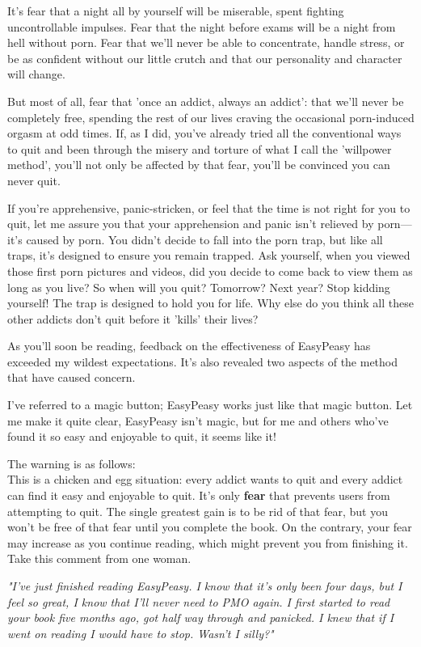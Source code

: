 \documentclass[easypeasy.tex]{subfiles}
\begin{document}
It's fear that a night all by yourself will be miserable, spent fighting uncontrollable impulses. Fear that the night before exams will be a night from hell without porn. Fear that we'll never be able to concentrate, handle stress, or be as confident without our little crutch and that our personality and character will change.

But most of all, fear that 'once an addict, always an addict': that we'll never be completely free, spending the rest of our lives craving the occasional porn-induced orgasm at odd times. If, as I did, you've already tried all the conventional ways to quit and been through the misery and torture of what I call the 'willpower method', you'll not only be affected by that fear, you'll be convinced you can never quit.

If you're apprehensive, panic-stricken, or feel that the time is not right for you to quit, let me assure you that your apprehension and panic isn't relieved by porn—it's caused by porn. You didn't decide to fall into the porn trap, but like all traps, it's designed to ensure you remain trapped. Ask yourself, when you viewed those first porn pictures and videos, did you decide to come back to view them as long as you live? So when will you quit? Tomorrow? Next year? Stop kidding yourself! The trap is designed to hold you for life. Why else do you think all these other addicts don't quit before it 'kills' their lives?

As you'll soon be reading, feedback on the effectiveness of EasyPeasy has exceeded my wildest expectations. It's also revealed two aspects of the method that have caused concern. 

I've referred to a magic button; EasyPeasy works just like that magic button. Let me make it quite clear, EasyPeasy isn't magic, but for me and others who've found it so easy and enjoyable to quit, it seems like it!

The warning is as follows: \\
This is a chicken and egg situation: every addict wants to quit and every addict can find it easy and enjoyable to quit. It's only \textbf{fear} that prevents users from attempting to quit. The single greatest gain is to be rid of that fear, but you won't be free of that fear until you complete the book. On the contrary, your fear may increase as you continue reading, which might prevent you from finishing it. Take this comment from one woman.

\textit{\textit{"I've just finished reading EasyPeasy. I know that it's only been four days, but I feel so great, I know that I'll never need to PMO again. I first started to read your book five months ago, got half way through and panicked. I knew that if I went on reading I would have to stop. Wasn't I silly?"}}
\end{document}
